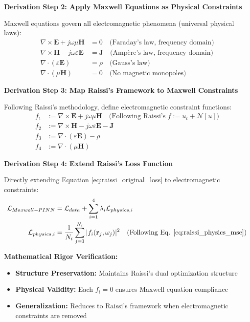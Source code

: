 \documentclass[12pt,a4paper]{article}
\begin{document}
\textbf{Derivation Step 2: Apply Maxwell Equations as Physical Constraints}

Maxwell equations govern all electromagnetic phenomena (universal physical laws):
\begin{align}
\nabla \times \mathbf{E} + j\omega\mu\mathbf{H} &= 0 \quad \text{(Faraday's law, frequency domain)} \label{eq:maxwell_faraday_freq}\\
\nabla \times \mathbf{H} - j\omega\varepsilon\mathbf{E} &= \mathbf{J} \quad \text{(Ampère's law, frequency domain)} \label{eq:maxwell_ampere_freq}\\
\nabla \cdot (\varepsilon\mathbf{E}) &= \rho \quad \text{(Gauss's law)} \label{eq:maxwell_gauss_freq}\\
\nabla \cdot (\mu\mathbf{H}) &= 0 \quad \text{(No magnetic monopoles)} \label{eq:maxwell_monopole_freq}
\end{align}

\textbf{Derivation Step 3: Map Raissi's Framework to Maxwell Constraints}

Following Raissi's methodology, define electromagnetic constraint functions:
\begin{align}
f_1 &:= \nabla \times \mathbf{E} + j\omega\mu\mathbf{H} \quad \text{(Following Raissi's } f := u_t + \mathcal{N}[u] \text{)} \label{eq:maxwell_constraint_1}\\
f_2 &:= \nabla \times \mathbf{H} - j\omega\varepsilon\mathbf{E} - \mathbf{J} \label{eq:maxwell_constraint_2}\\
f_3 &:= \nabla \cdot (\varepsilon\mathbf{E}) - \rho \label{eq:maxwell_constraint_3}\\
f_4 &:= \nabla \cdot (\mu\mathbf{H}) \label{eq:maxwell_constraint_4}
\end{align}

\textbf{Derivation Step 4: Extend Raissi's Loss Function}

Directly extending Equation \ref{eq:raissi_original_loss} to electromagnetic constraints:
\begin{align}
\mathcal{L}_{Maxwell-PINN} &= \mathcal{L}_{data} + \sum_{i=1}^{4} \lambda_i \mathcal{L}_{physics,i} \label{eq:maxwell_pinn_extended_loss}\\
\mathcal{L}_{physics,i} &= \frac{1}{N_i} \sum_{j=1}^{N_i} |f_i(\mathbf{r}_j, \omega_j)|^2 \quad \text{(Following Eq. \ref{eq:raissi_physics_mse})} \label{eq:maxwell_physics_loss_detail}
\end{align}

\textbf{Mathematical Rigor Verification:}
\begin{itemize}
\item \textbf{Structure Preservation:} Maintains Raissi's dual optimization structure
\item \textbf{Physical Validity:} Each $f_i = 0$ ensures Maxwell equation compliance
\item \textbf{Generalization:} Reduces to Raissi's framework when electromagnetic constraints are removed
\end{itemize}
\end{document}
